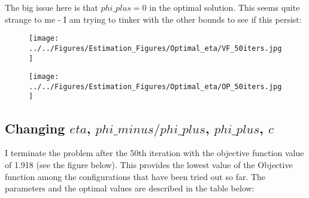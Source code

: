 \documentclass{../cls/NotesV2_Class}
\begin{document}
The big issue here is that $phi\_plus=0$ in the optimal solution. This seems quite strange to me - I am trying to tinker with the other bounds to see if this persist:

\begin{figure}[htbp!]
\texttt{[image: ../../Figures/Estimation\_Figures/Optimal\_eta/VF\_50iters.jpg]}
\end{figure}

\begin{figure}[htbp!]
\texttt{[image: ../../Figures/Estimation\_Figures/Optimal\_eta/OP\_50iters.jpg]}
\end{figure}

%


\subsection{Changing $eta$, $phi\_minus/phi\_plus$, $phi\_plus$, $c$}

I terminate the problem after the 50th iteration with the objective function value of 1.918 (see the figure below). This provides the lowest value of the Objective function among the configurations that have been tried out so far. The parameters and the optimal values are described in the table below:
\end{document}
